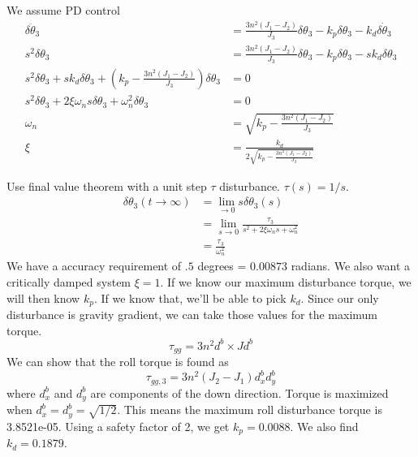 \documentclass[]{article}
\begin{document}
We assume PD control
\begin{align}
	\delta \ddot{\theta}_3 & = \frac{3n^2(J_1 - J_2)}{J_3} \delta \theta_3 - k_p \delta \theta_3 - k_d \delta \dot{\theta}_3 \\
	s^2 \delta \theta_3 & = \frac{3n^2(J_1 - J_2)}{J_3} \delta \theta_3 - k_p \delta \theta_3 - s k_d \delta \theta_3 \\
	s^2 \delta \theta_3 + s k_d \delta \theta_3 + \left(k_p - \frac{3n^2(J_1 - J_2)}{J_3}\right) \delta \theta_3  & = 0 \\
	s^2 \delta \theta_3 + 2 \xi \omega_n s \delta \theta_3 + \omega_n^2 \delta \theta_3  & = 0 \\
	\omega_n & = \sqrt{k_p - \frac{3n^2(J_1 - J_2)}{J_3}} \\
	\xi & = \frac{k_d}{2 \sqrt{k_p - \frac{3n^2(J_1 - J_2)}{J_3}}}
\end{align}

Use final value theorem with a unit step $\tau$ disturbance. $\tau(s) = 1/s$.
\begin{align}
	\delta \theta_3 (t \rightarrow \infty) & = \lim_{\rightarrow 0} s \delta \theta_3(s) \\
	& = \lim_{s \rightarrow 0} \frac{\tau_3}{s^2 + 2\xi \omega_n s + \omega_n^2} \\
	& = \frac{\tau_3}{\omega_n^2}
\end{align}
We have a accuracy requirement of $.5$ degrees = $0.00873$ radians. We also want a critically damped system $\xi = 1$. If we know our maximum disturbance torque, we will then know $k_p$. If we know that, we'll be able to pick $k_d$. Since our only disturbance is gravity gradient, we can take those values for the maximum torque.
\begin{equation}
	\tau_{gg} = 3 n^2 d^b \times J d^b
\end{equation}
We can show that the roll torque is found as
\begin{equation}
	\tau_{gg,3} = 3n^2 (J_2 - J_1) d_x^b d_y^b
\end{equation}
where $d_x^b$ and $d_y^b$ are components of the down direction. Torque is maximized when $d_x^b = d_y^b = \sqrt{1/2}$. This means the maximum roll disturbance torque is 3.8521e-05. Using a safety factor of 2, we get $k_p = 0.0088$. We also find $k_d = 0.1879$.
\end{document}
